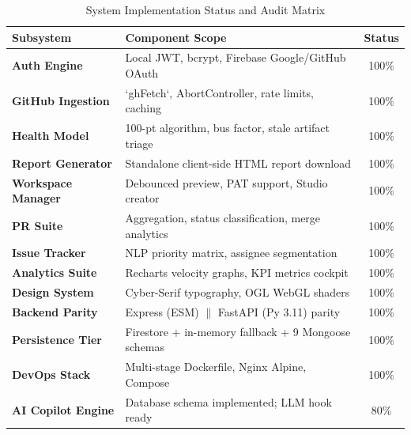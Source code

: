 \documentclass[conference]{IEEEtran}
\begin{document}
\begin{table}[htbp]
\caption{System Implementation Status and Audit Matrix}
\label{tab:audit}
\centering
\small
\begin{tabularx}{\columnwidth}{l X c}
\toprule
\textbf{Subsystem} & \textbf{Component Scope} & \textbf{Status} \\
\midrule
\textbf{Auth Engine} & Local JWT, bcrypt, Firebase Google/GitHub OAuth & 100\% \\
\textbf{GitHub Ingestion} & `ghFetch`, AbortController, rate limits, caching & 100\% \\
\textbf{Health Model} & 100-pt algorithm, bus factor, stale artifact triage & 100\% \\
\textbf{Report Generator} & Standalone client-side HTML report download & 100\% \\
\textbf{Workspace Manager} & Debounced preview, PAT support, Studio creator & 100\% \\
\textbf{PR Suite} & Aggregation, status classification, merge analytics & 100\% \\
\textbf{Issue Tracker} & NLP priority matrix, assignee segmentation & 100\% \\
\textbf{Analytics Suite} & Recharts velocity graphs, KPI metrics cockpit & 100\% \\
\textbf{Design System} & Cyber-Serif typography, OGL WebGL shaders & 100\% \\
\textbf{Backend Parity} & Express (ESM) $\parallel$ FastAPI (Py 3.11) parity & 100\% \\
\textbf{Persistence Tier} & Firestore + in-memory fallback + 9 Mongoose schemas & 100\% \\
\textbf{DevOps Stack} & Multi-stage Dockerfile, Nginx Alpine, Compose & 100\% \\
\textbf{AI Copilot Engine} & Database schema implemented; LLM hook ready & 80\% \\
\bottomrule
\end{tabularx}
\end{table}

\end{document}
